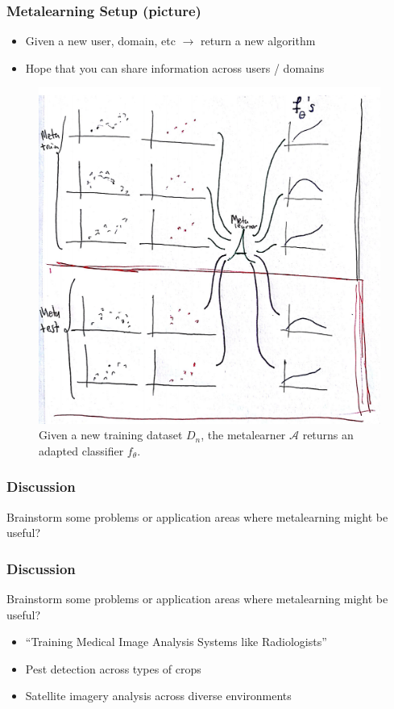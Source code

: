 \documentclass[10pt,mathserif]{beamer}
\begin{document}
\begin{frame}
  \frametitle{Metalearning Setup (picture)}
  \begin{itemize}
  \item Given a new user, domain, etc $\rightarrow$ return a new algorithm
  \item Hope that you can share information across users / domains
  \end{itemize}
  \begin{figure}[ht]
    \centering
    \includegraphics[width=0.45\paperwidth]{figure/metalearning_setup_curves}
    \caption{Given a new training dataset $D_n$, the metalearner $\mathcal{A}$
      returns an adapted classifier
      $f_{\theta}$. \label{fig:metalearning_setup_boxes}}
  \end{figure}
\end{frame}

\begin{frame}
  \frametitle{Discussion}
  Brainstorm some problems or application areas where metalearning might
  be useful?
\end{frame}

\begin{frame}
  \frametitle{Discussion}
  Brainstorm some problems or application areas where metalearning might
  be useful?
  \begin{itemize}
  \item ``Training Medical Image Analysis Systems like Radiologists''
  \item Pest detection across types of crops
  \item Satellite imagery analysis across diverse environments
  \end{itemize}
\end{frame}
\end{document}
